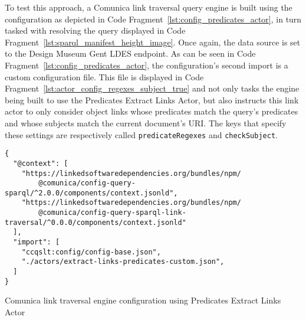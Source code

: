 To test this approach, a Comunica link traversal query engine is built using the configuration as depicted in Code Fragment~\ref{lst:config_predicates_actor}, in turn tasked with resolving the query displayed in Code Fragment~\ref{lst:sparql_manifest_height_image}. Once again, the data source is set to the Design Museum Gent LDES endpoint. As can be seen in Code Fragment~\ref{lst:config_predicates_actor}, the configuration's second import is a custom configuration file. This file is displayed in Code Fragment~\ref{lst:actor_config_regexes_subject_true} and not only tasks the engine being built to use the Predicates Extract Links Actor, but also instructs this link actor to only consider object links whose predicates match the query's predicates and whose subjects match the current document's URI. The keys that specify these settings are respectively called \texttt{predicateRegexes} and \texttt{checkSubject}.

\begin{listing}[htbp]
    \begin{verbatim}
{
  "@context": [
    "https://linkedsoftwaredependencies.org/bundles/npm/
        @comunica/config-query-sparql/^2.0.0/components/context.jsonld",
    "https://linkedsoftwaredependencies.org/bundles/npm/
        @comunica/config-query-sparql-link-traversal/^0.0.0/components/context.jsonld"
  ],
  "import": [
    "ccqslt:config/config-base.json",
    "./actors/extract-links-predicates-custom.json",
  ]
}
    \end{verbatim}
    \caption{Comunica link traversal engine configuration using Predicates Extract Links Actor}
    \label{lst:config_predicates_actor}
\end{listing}

